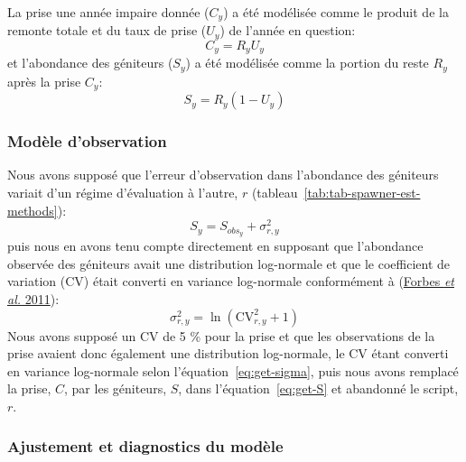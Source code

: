 \documentclass[french,11pt]{book}
\begin{document}
La prise une année impaire donnée (\(C_y\)) a été modélisée comme le produit de la remonte totale et du taux de prise (\(U_y\)) de l'année en question:
\begin{equation}
 C_y = R_y U_y
\label{eq:harvest}
\end{equation}
et l'abondance des géniteurs (\(S_y\)) a été modélisée comme la portion du reste \(R_y\) après la prise \(C_y\):
\begin{equation}
S_y = R_y (1 - U_y)
\label{eq:get-S}
\end{equation}
\hypertarget{moduxe8le-dobservation}{%
\subsubsection{Modèle d'observation}\label{moduxe8le-dobservation}}

Nous avons supposé que l'erreur d'observation dans l'abondance des géniteurs variait d'un régime d'évaluation à l'autre, \(r\) (tableau~\ref{tab:tab-spawner-est-methods}):
\begin{equation}
S_y = S_{obs_y} + \sigma^2_{r,y}
\label{eq:get-S}
\end{equation}
puis nous en avons tenu compte directement en supposant que l'abondance observée des géniteurs avait une distribution log-normale et que le coefficient de variation (CV) était converti en variance log-normale conformément à (\protect\hyperlink{ref-forbes_statistical_2011}{Forbes \emph{et al.} 2011}):
\begin{equation}
\sigma^2_{r,y} = \ln\left(\mathrm{CV}_{r,y}^2 + 1\right)
\label{eq:get-sigma}
\end{equation}
Nous avons supposé un CV de 5 \% pour la prise et que les observations de la prise avaient donc également une distribution log-normale, le CV étant converti en variance log-normale selon l'équation~\ref{eq:get-sigma}, puis nous avons remplacé la prise, \(C\), par les géniteurs, \(S\), dans l'équation~\ref{eq:get-S} et abandonné le script, \(r\).

\hypertarget{ajustement-et-diagnostics-du-moduxe8le}{%
\subsubsection{Ajustement et diagnostics du modèle}\label{ajustement-et-diagnostics-du-moduxe8le}}
\end{document}

